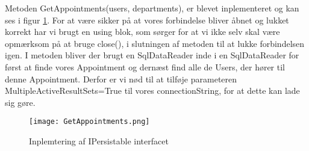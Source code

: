 Metoden GetAppointments(users, departments), er blevet inplementeret og kan ses i figur \ref{fig:GetAppointments}.
For at være sikker på at vores forbindelse bliver åbnet og lukket korrekt har vi brugt en using blok, som sørger for at vi ikke selv skal være opmærksom på at bruge close(), i slutningen af metoden til at lukke forbindelsen igen.
I metoden bliver der brugt en SqlDataReader inde i en SqlDataReader for først at finde vores Appointment og dernæst find alle de Users, der hører til denne Appointment.
Derfor er vi nød til at tilføje parameteren MultipleActiveResultSets=True til vores connectionString, for at dette kan lade sig gøre.

\begin{figure}[h]
    \caption{Inplemtering af IPersistable interfacet}
    \centering
        \texttt{[image: GetAppointments.png]}
    \label{fig:GetAppointments}
\end{figure}
